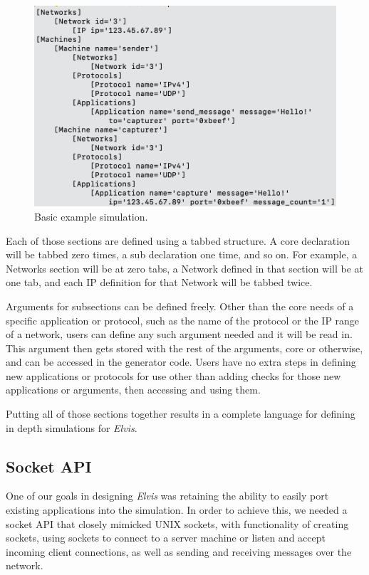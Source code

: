 \documentclass[journal]{IEEEtran} %
\newcommand{\elvis}{\textit{Elvis}}
\begin{document}
\begin{figure}[htbp]
    \centerline{\includegraphics[width=\columnwidth]{Images/ndl-sample-new.png}}
    \caption{Basic example simulation.}
    \label{fig:basic}
\end{figure}

Each of those sections are defined using a tabbed structure. A core declaration will be tabbed zero times, a sub declaration one time, and so on. For example, a Networks section will be at zero tabs, a Network defined in that section will be at one tab, and each IP definition for that Network will be tabbed twice.

Arguments for subsections can be defined freely. Other than the core needs of a specific application or protocol, such as the name of the protocol or the IP range of a network, users can define any such argument needed and it will be read in. This argument then gets stored with the rest of the arguments, core or otherwise, and can be accessed in the generator code. Users have no extra steps in defining new applications or protocols for use other than adding checks for those new applications or arguments, then accessing and using them.

Putting all of those sections together results in a complete language for defining in depth simulations for \elvis{}.

\subsection{Socket API}

One of our goals in designing \elvis{} was retaining the ability to easily port existing applications into the simulation. In order to achieve this, we needed a socket API that closely mimicked UNIX sockets, with functionality of creating sockets, using sockets to connect to a server machine or listen and accept incoming client connections, as well as sending and receiving messages over the network.
\end{document}
